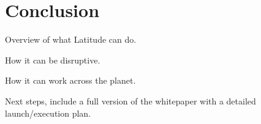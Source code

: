 \section{Conclusion}
\label{sec:conc}

Overview of what Latitude can do.

How it can be disruptive.

How it can work across the planet.

Next steps, include a full version of the whitepaper with a detailed launch/execution plan.
